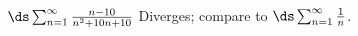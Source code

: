 {$\ds \sum_{n=1}^\infty \frac{n-10}{n^2+10n+10}$
}
{Diverges; compare to $\ds \sum_{n=1}^\infty \frac {1}{n}$.
}